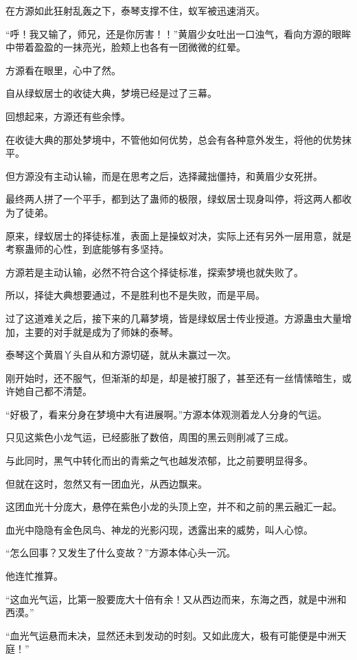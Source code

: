 \begin{this_body}
在方源如此狂射乱轰之下，泰琴支撑不住，蚁军被迅速消灭。

“呼！我又输了，师兄，还是你厉害！！”黄眉少女吐出一口浊气，看向方源的眼眸中带着盈盈的一抹亮光，脸颊上也各有一团微微的红晕。

方源看在眼里，心中了然。

自从绿蚁居士的收徒大典，梦境已经是过了三幕。

回想起来，方源还有些余悸。

在收徒大典的那处梦境中，不管他如何优势，总会有各种意外发生，将他的优势抹平。

但方源没有主动认输，而是在思考之后，选择藏拙僵持，和黄眉少女死拼。

最终两人拼了一个平手，都到达了蛊师的极限，绿蚁居士现身叫停，将这两人都收为了徒弟。

原来，绿蚁居士的择徒标准，表面上是操蚁对决，实际上还有另外一层用意，就是考察蛊师的心性，到底能够有多坚持。

方源若是主动认输，必然不符合这个择徒标准，探索梦境也就失败了。

所以，择徒大典想要通过，不是胜利也不是失败，而是平局。

过了这道难关之后，接下来的几幕梦境，皆是绿蚁居士传业授道。方源蛊虫大量增加，主要的对手就是成为了师妹的泰琴。

泰琴这个黄眉丫头自从和方源切磋，就从未赢过一次。

刚开始时，还不服气，但渐渐的却是，却是被打服了，甚至还有一丝情愫暗生，或许她自己都不清楚。

“好极了，看来分身在梦境中大有进展啊。”方源本体观测着龙人分身的气运。

只见这紫色小龙气运，已经膨胀了数倍，周围的黑云则削减了三成。

与此同时，黑气中转化而出的青紫之气也越发浓郁，比之前要明显得多。

但就在这时，忽然又有一团血光，从西边飘来。

这团血光十分庞大，悬停在紫色小龙的头顶上空，并不和之前的黑云融汇一起。

血光中隐隐有金色凤鸟、神龙的光影闪现，透露出来的威势，叫人心惊。

“怎么回事？又发生了什么变故？”方源本体心头一沉。

他连忙推算。

“这血光气运，比第一股要庞大十倍有余！又从西边而来，东海之西，就是中洲和西漠。”

“血光气运悬而未决，显然还未到发动的时刻。又如此庞大，极有可能便是中洲天庭！”


\end{this_body}
